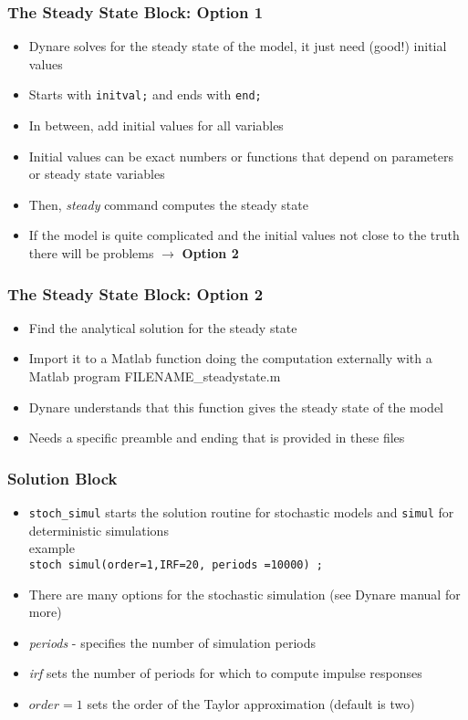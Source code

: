 \documentclass[xcolor=dvipsnames,handout,aspectratio=169]{beamer}
\begin{document}
\begin{frame}[t]\frametitle{\textbf{The Steady State Block: Option 1}}
  \begin{itemize}
  \setlength\itemsep{1em}
  \item Dynare solves for the steady state of the model, it just need (good!) initial values 
  \item Starts with \texttt{initval;} and ends with \texttt{end;} 
  \item In between, add initial values for all variables
  \item Initial values can be exact numbers or functions that depend on parameters or steady state variables
  \item Then, \emph{steady} command computes the steady state
  \item If the model is quite complicated and the initial values not close to the truth there will be problems $\rightarrow$ \textbf{Option 2}
 \end{itemize}
\end{frame}

\begin{frame}[t]\frametitle{\textbf{The Steady State Block: Option 2}}
  \begin{itemize}
  \setlength\itemsep{1em}
  \item Find the analytical solution for the steady state 
  \item Import it to a Matlab function doing the computation externally with a Matlab program FILENAME\_steadystate.m
  \item Dynare understands that this function gives the steady state of the model
  \item Needs a specific preamble and ending that is provided in these files
 \end{itemize}
\end{frame}

\begin{frame}[t]\frametitle{\textbf{Solution Block}}
  \begin{itemize}
  \setlength\itemsep{1em}
  \item \texttt{stoch\_simul} starts the solution routine for stochastic models and \texttt{simul} for deterministic simulations \\
  example \\
  \texttt{stoch simul(order=1,IRF=20, periods =10000) ;}
  \item There are many options for the stochastic simulation (see Dynare manual for more)
  \item \emph{periods} - specifies the number of simulation periods
  \item \emph{irf} sets the number of periods for which to compute impulse responses
  \item \emph{$order=1$} sets the order of the Taylor approximation (default is two)
 \end{itemize}
\end{frame}
\end{document}
